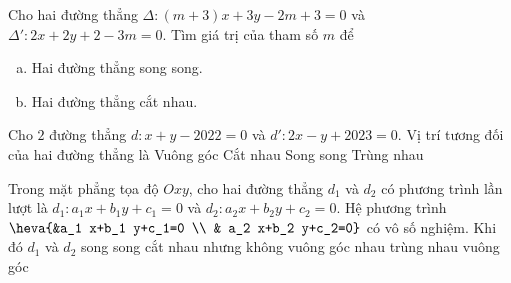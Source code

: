 \begin{bt}%
	Cho hai đường thẳng $\Delta\colon (m+3)x+3y-2m+3=0$ và $\Delta'\colon 2x+2y+2-3m=0$. Tìm giá trị của tham số $m$ để
	\begin{enumerate}[a)]
		\item Hai đường thẳng song song.
		\item Hai đường thẳng cắt nhau.
	\end{enumerate}
\end{bt}


\begin{ex}%
	Cho $2$ đường thẳng $d\colon x + y -2022=0$ và $d'\colon 2x - y + 2023=0$. Vị trí  tương đối của hai đường thẳng là
	\choice 
		{Vuông  góc}
		{\True  Cắt nhau}
		 {Song song}
		{Trùng nhau} 
\end{ex}

\begin{ex}%
	Trong mặt phẳng  tọa độ $Oxy$, cho hai đường thẳng $d_1$ và $d_2$ có phương trình lần lượt là $d_1\colon a_1x+b_1y+c_1=0$ và $d_2\colon a_2x+b_2y+c_2=0$. Hệ phương trình $\heva{&a_1 x+b_1 y+c_1=0 \\ & a_2 x+b_2 y+c_2=0}$ có vô số nghiệm. Khi đó $d_1$ và $d_2$
	\choice 
		{song  song}
		 {cắt nhau nhưng không vuông góc nhau}
		{\True trùng nhau} 
		{vuông góc} 
\end{ex}

